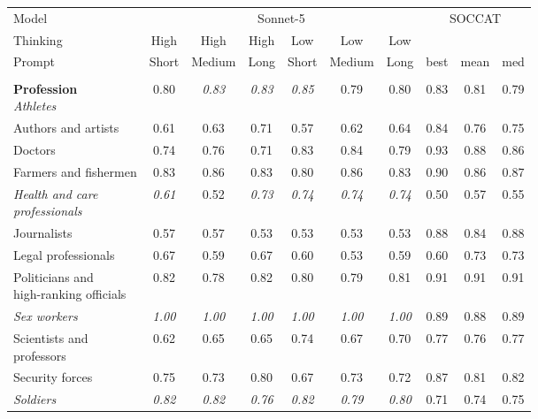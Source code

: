 \begin{table}[htb]
\centering
\renewcommand{\arraystretch}{0.9}
\scriptsize
\begin{threeparttable}
\begin{tabular}{l c c c c c c c c c}
\toprule
Model & \multicolumn{6}{c}{Sonnet-5} & \multicolumn{3}{c}{SOCCAT} \\
\cmidrule(lr){2-7} \cmidrule(lr){8-10}
Thinking & High & High & High & Low & Low & Low &  &  &  \\
Prompt & Short & Medium & Long & Short & Medium & Long & best & mean & med \\
\midrule
\rule{0pt}{5pt} &  &  &  &  &  &  &  &  &  \\
\shortstack[l]{\textbf{Profession}\\[3pt]\textit{Athletes}} & 0.80 & \textit{0.83} & \textit{0.83} & \textit{0.85} & 0.79 & 0.80 & 0.83 & 0.81 & 0.79 \\
Authors and artists & 0.61 & 0.63 & 0.71 & 0.57 & 0.62 & 0.64 & 0.84 & 0.76 & 0.75 \\
Doctors & 0.74 & 0.76 & 0.71 & 0.83 & 0.84 & 0.79 & 0.93 & 0.88 & 0.86 \\
Farmers and fishermen & 0.83 & 0.86 & 0.83 & 0.80 & 0.86 & 0.83 & 0.90 & 0.86 & 0.87 \\
\shortstack[l]{\textit{Health and care}\\[-3pt]\textit{professionals}} & \textit{0.61} & 0.52 & \textit{0.73} & \textit{0.74} & \textit{0.74} & \textit{0.74} & 0.50 & 0.57 & 0.55 \\
Journalists & 0.57 & 0.57 & 0.53 & 0.53 & 0.53 & 0.53 & 0.88 & 0.84 & 0.88 \\
Legal professionals & 0.67 & 0.59 & 0.67 & 0.60 & 0.53 & 0.59 & 0.60 & 0.73 & 0.73 \\
\shortstack[l]{Politicians and\\[-3pt]high-ranking officials} & 0.82 & 0.78 & 0.82 & 0.80 & 0.79 & 0.81 & 0.91 & 0.91 & 0.91 \\
\textit{Sex workers} & \textit{1.00} & \textit{1.00} & \textit{1.00} & \textit{1.00} & \textit{1.00} & \textit{1.00} & 0.89 & 0.88 & 0.89 \\
\shortstack[l]{Scientists and\\[-3pt]professors} & 0.62 & 0.65 & 0.65 & 0.74 & 0.67 & 0.70 & 0.77 & 0.76 & 0.77 \\
Security forces & 0.75 & 0.73 & 0.80 & 0.67 & 0.73 & 0.72 & 0.87 & 0.81 & 0.82 \\
\textit{Soldiers} & \textit{0.82} & \textit{0.82} & \textit{0.76} & \textit{0.82} & \textit{0.79} & \textit{0.80} & 0.71 & 0.74 & 0.75 \\

\end{tabular}
\end{threeparttable}
\end{table}
